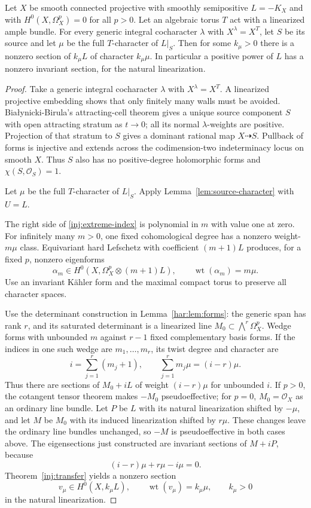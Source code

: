 \begin{theorem}
\label{inj:extremal-theorem}
Let $X$ be smooth connected projective with smoothly semipositive
$L=-K_X$ and with $H^0(X,\Omega_X^p)=0$ for all $p>0$.
Let an algebraic torus $T$ act with a linearized ample bundle.
For every generic integral cocharacter $\lambda$ with $X^\lambda=X^T$, let $S$ be its source and let $\mu$ be the full $T$-character of $L|_S$. Then for some $k_\mu>0$ there is a nonzero section of $k_\mu L$ of character $k_\mu\mu$. In particular a positive power of $L$ has a nonzero invariant section, for the natural linearization.
\end{theorem}

\begin{proof}
Take a generic integral cocharacter $\lambda$ with
$X^\lambda=X^T$.  A linearized projective embedding shows that
only finitely many walls must be avoided.  Bia\l ynicki-Birula's
attracting-cell theorem \cite{BB1973} gives a unique source
component $S$ with open attracting stratum as $t\to0$; all its
normal $\lambda$-weights are positive.  Projection of that stratum
to $S$ gives a dominant rational map $X\dashrightarrow S$.
Pullback of forms is injective and extends across the codimension-two
indeterminacy locus on smooth $X$.  Thus $S$ also has no
positive-degree holomorphic forms and
$\chi(S,\mathcal O_S)=1$.

Let $\mu$ be the full $T$-character of $L|_S$. Apply Lemma~\ref{lem:source-character} with $U=L$.

The right side of \eqref{inj:extreme-index} is polynomial in $m$
with value one at zero.  For infinitely many $m>0$, one fixed
cohomological degree has a nonzero weight-$m\mu$ class.
Equivariant hard Lefschetz with coefficient $(m+1)L$ produces,
for a fixed $p$, nonzero eigenforms
\[
 \alpha_m\in H^0(X,\Omega_X^p\otimes(m+1)L),
 \qquad\operatorname{wt}(\alpha_m)=m\mu.
\]
Use an invariant K\"ahler form and the maximal compact torus to
preserve all character spaces.

Use the determinant construction in Lemma~\ref{har:lem:forms}: the
generic span has rank $r$, and its saturated determinant is a linearized
line $M_0\subset\bigwedge^r\Omega_X^p$. Wedge forms with unbounded $m$
against $r-1$ fixed complementary basis forms. If the indices in one
such wedge are $m_1,\ldots,m_r$, its twist degree and character are
\[
 i=\sum_{j=1}^r(m_j+1),\qquad
 \sum_{j=1}^r m_j\mu=(i-r)\mu.
\]
Thus there are sections of $M_0+iL$ of weight $(i-r)\mu$ for unbounded
$i$. If $p>0$, the cotangent tensor theorem
\cite[Theorem 4.1]{LMPTX2023} makes $-M_0$ pseudoeffective;
for $p=0$, $M_0=\mathcal O_X$ as an ordinary line bundle.
Let $P$ be $L$ with its natural linearization shifted by $-\mu$,
and let $M$ be $M_0$ with its induced linearization shifted by
$r\mu$. These changes leave the ordinary line bundles unchanged,
so $-M$ is pseudoeffective in both cases above. The eigensections
just constructed are invariant sections of $M+iP$, because
\[
 (i-r)\mu+r\mu-i\mu=0.
\]
Theorem~\ref{inj:transfer} yields a nonzero section
\[
 v_\mu\in H^0(X,k_\mu L),\qquad
 \operatorname{wt}(v_\mu)=k_\mu\mu,
 \qquad k_\mu>0
\]
in the natural linearization.


\end{proof}
